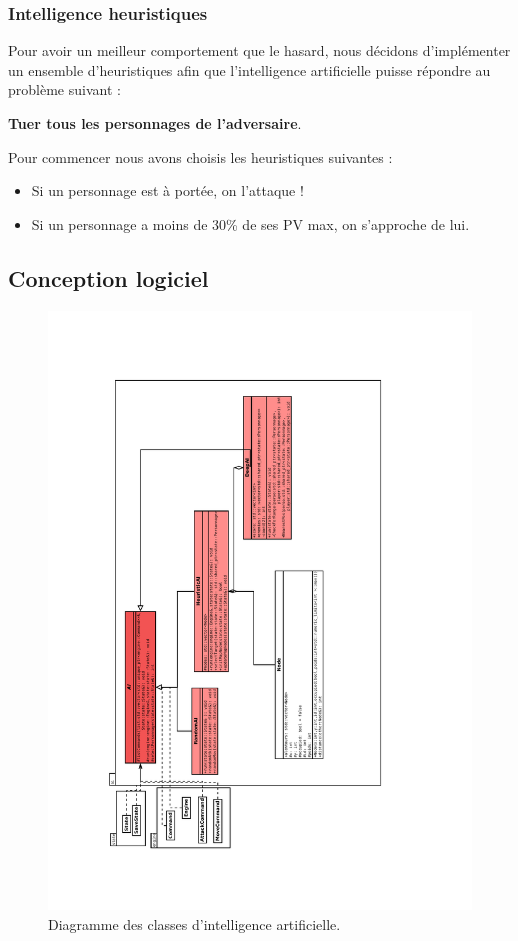 \documentclass[a4paper,12pt]{article}
\begin{document}
\subsubsection{Intelligence heuristiques}
Pour avoir un meilleur comportement que le hasard, nous décidons d'implémenter un ensemble d'heuristiques afin que l'intelligence artificielle puisse répondre au problème suivant :\\
\begin{center}
\textbf{Tuer tous les personnages de l'adversaire}.
\end{center}
Pour commencer nous avons choisis les heuristiques suivantes :\\
\begin{itemize}
\item Si un personnage est à portée, on l'attaque !
\item Si un personnage a moins de 30\% de ses PV max, on s'approche de lui.
\end{itemize}
\clearpage

\clearpage
\subsection{Conception logiciel}


\begin{landscape}
\begin{figure}[p]
\includegraphics[width=0.6\paperheight,angle=270]{ai.pdf}
\caption{\label{uml:ai}Diagramme des classes d'intelligence artificielle.} 
\end{figure}
\end{landscape}
\end{document}
